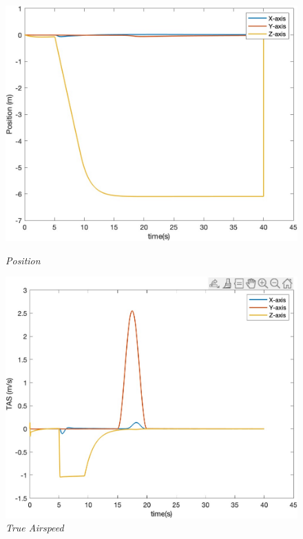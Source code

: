 \begin{figure}[htbp]
  \centering
  \begin{minipage}[b]{0.45\textwidth}
    \centering
    \includegraphics[width=\textwidth]{Images/Gust/VTOL pulse/1 position_3.jpg}
    \caption*{\textit{Position}}
  \end{minipage}
  \hfil
  \begin{minipage}[b]{0.45\textwidth}
    \centering
    \includegraphics[width=\textwidth]{Images/Gust/VTOL pulse/2 airspeed_3.jpg}
    \caption*{\textit{True Airspeed}}
  \end{minipage}

\end{figure}
